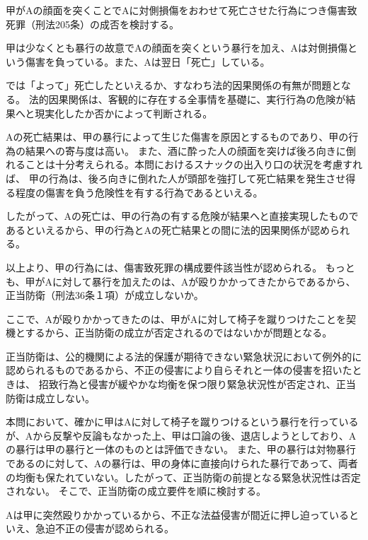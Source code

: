 \documentclass[11pt]{jsarticle}
\title{\vspace{-30mm}{\textgt{\Large{\fbox{12} 赤いレンガの衝撃}}}}
\date{\vspace{-15mm}}
\begin{document}
\maketitle

\sectionA{}
	甲がAの顔面を突くことでAに対側損傷をおわせて死亡させた行為につき傷害致死罪（刑法205条）の成否を検討する。
	
	\sectionB{}
		甲は少なくとも暴行の故意でAの顔面を突くという暴行を加え、Aは対側損傷という傷害を負っている。また、Aは翌日「死亡」している。
		
		では「よって」死亡したといえるか、すなわち法的因果関係の有無が問題となる。
		法的因果関係は、客観的に存在する全事情を基礎に、実行行為の危険が結果へと現実化したか否かによって判断される。
		
		Aの死亡結果は、甲の暴行によって生じた傷害を原因とするものであり、甲の行為の結果への寄与度は高い。
		また、酒に酔った人の顔面を突けば後ろ向きに倒れることは十分考えられる。本問におけるスナックの出入り口の状況を考慮すれば、
		甲の行為は、後ろ向きに倒れた人が頭部を強打して死亡結果を発生させ得る程度の傷害を負う危険性を有する行為であるといえる。
		
		したがって、Aの死亡は、甲の行為の有する危険が結果へと直接実現したものであるといえるから、甲の行為とAの死亡結果との間に法的因果関係が認められる。
		
		以上より、甲の行為には、傷害致死罪の構成要件該当性が認められる。
	\sectionB{}
		もっとも、甲がAに対して暴行を加えたのは、Aが殴りかかってきたからであるから、正当防衛（刑法36条１項）が成立しないか。
		
		\sectionC{}
			ここで、Aが殴りかかってきたのは、甲がAに対して椅子を蹴りつけたことを契機とするから、正当防衛の成立が否定されるのではないかが問題となる。
			
			正当防衛は、公的機関による法的保護が期待できない緊急状況において例外的に認められるものであるから、不正の侵害により自らそれと一体の侵害を招いたときは、
			招致行為と侵害が緩やかな均衡を保つ限り緊急状況性が否定され、正当防衛は成立しない。
			
			本問において、確かに甲はAに対して椅子を蹴りつけるという暴行を行っているが、Aから反撃や反論もなかった上、甲は口論の後、退店しようとしており、Aの暴行は甲の暴行と一体のものとは評価できない。
			また、甲の暴行は対物暴行であるのに対して、Aの暴行は、甲の身体に直接向けられた暴行であって、両者の均衡も保たれていない。したがって、正当防衛の前提となる緊急状況性は否定されない。
		\sectionC{}
			そこで、正当防衛の成立要件を順に検討する。
			
			Aは甲に突然殴りかかっているから、不正な法益侵害が間近に押し迫っているといえ、急迫不正の侵害が認められる。
			
\end{document}
